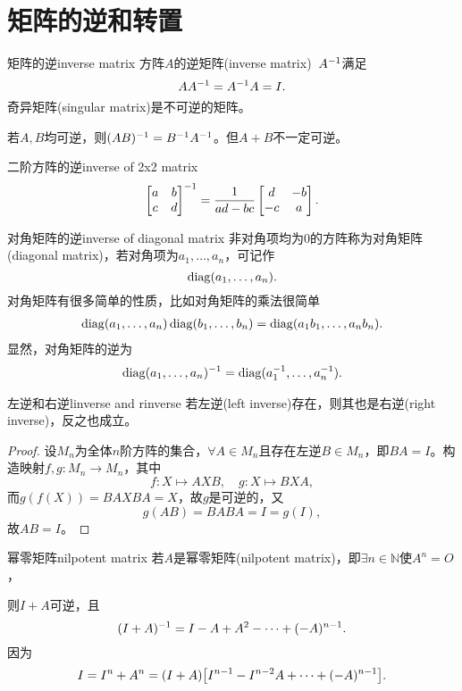 \section{矩阵的逆和转置}
\begin{definition}{矩阵的逆}{inverse matrix}
	方阵$A$的逆矩阵(inverse matrix)~$A^{-1}$满足
	\[
		AA^{-1}=A^{-1} A=I.
	\]
	奇异矩阵(singular matrix)是不可逆的矩阵。
\end{definition}
若$A,B$均可逆，则$(AB)^{-1}=B^{-1} A^{-1}$。但$A+B$不一定可逆。
\begin{example}{二阶方阵的逆}{inverse of 2x2 matrix}
	\begin{equation}
		\begin{bmatrix}
			a&b\\c&d
		\end{bmatrix}^{-1}=\frac1{ad-bc}
		\begin{bmatrix}
			d&-b\\
			-c&a
		\end{bmatrix}.
	\end{equation}
\end{example}
\begin{example}{对角矩阵的逆}{inverse of diagonal matrix}
	非对角项均为0的方阵称为对角矩阵(diagonal matrix)，若对角项为$a_1,\ldots,a_n$，可记作
	\[
		\operatorname{diag}(a_1,\ldots,a_n).
	\]
	对角矩阵有很多简单的性质，比如对角矩阵的乘法很简单
	\begin{align}
		\operatorname{diag}(a_1,\ldots,a_n)\operatorname{diag}(b_1,\ldots,b_n)=\operatorname{diag}(a_1b_1,\ldots,a_nb_n).
	\end{align}
	显然，对角矩阵的逆为
	\begin{align}
		\operatorname{diag}(a_1,\ldots,a_n)^{-1}=\operatorname{diag}(a_1^{-1},\ldots,a_n^{-1}).
	\end{align}
\end{example}
\begin{theorem}{左逆和右逆}{linverse and rinverse}
	若左逆(left inverse)存在，则其也是右逆(right inverse)，反之也成立。
\end{theorem}
\begin{proof}
	设$M_n$为全体$n$阶方阵的集合，$\forall A\in M_n$且存在左逆$B\in M_n$，即$BA=I$。构造映射$f,g: M_n\to M_n$，其中
	\[
		f:X\mapsto AXB,\quad g:X\mapsto BXA,
	\]
	而$g(f(X))=BAXBA=X$，故$g$是可逆的，又
	\[
		g(AB)=BABA=I=g(I),
	\]
	故$AB=I$。
\end{proof}
\begin{example}{幂零矩阵}{nilpotent matrix}
	若$A$是幂零矩阵(nilpotent matrix)，即$\exists n\in\mathbb N$使$A^n=O$，
	
	则$I+A$可逆，且
	\[
		(I+A)^{-1}=I-A+A^2-\cdots+(-A)^{n-1}.
	\]
	因为
	\[
		I=I^n+A^n=(I+A)\bigl[I^{n-1}-I^{n-2}A+\cdots+(-A)^{n-1}\bigr].
	\]
\end{example}
